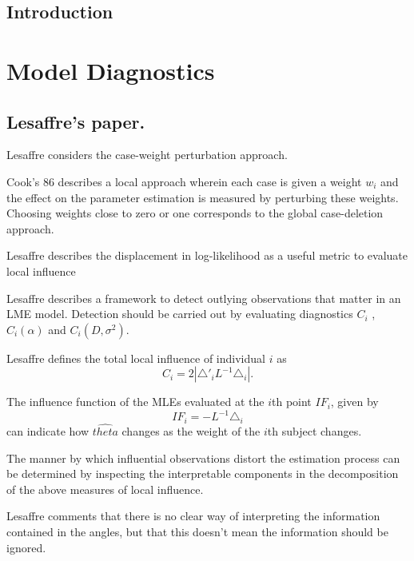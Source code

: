 \documentclass[12pt, a4paper]{report}
\theoremstyle{plain}
\theoremstyle{definition}
\theoremstyle{remark}
\begin{document}
\section{Introduction}


\chapter{Model Diagnostics}

\newpage
\section{Lesaffre's paper.} %

Lesaffre considers the case-weight perturbation approach.


Cook's 86 describes a local approach wherein each case is given a weight $w_{i}$ and the effect on the parameter estimation is measured by perturbing these weights. Choosing weights close to zero or one corresponds to the global case-deletion approach.

Lesaffre  describes the displacement in log-likelihood as a useful metric to evaluate local influence %


Lesaffre describes a framework to detect outlying observations that matter in an LME model. Detection should be carried out by evaluating diagnostics $C_{i}$ , $C_{i}(\alpha)$ and $C_{i}(D,\sigma^2)$.


Lesaffre defines the total local influence of individual $i$ as
\begin{equation}
C_{i} = 2 | \triangle \prime _{i} L^{-1} \triangle_{i}|.
\end{equation}


The influence function of the MLEs evaluated at the $i$th point $IF_{i}$, given by
\begin{equation}
IF_{i} = -L^{-1}\triangle _{i}
\end{equation}
can indicate how $\hat{theta}$ changes as the weight of the $i$th
subject changes.

The manner by which influential observations distort the estimation process can be determined by inspecting the
interpretable components in the decomposition of the above measures of local influence.


Lesaffre comments that there is no clear way of interpreting the information contained in the angles, but that this doesn't mean the information should be ignored.
\end{document}
